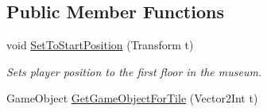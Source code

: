 \subsection*{Public Member Functions}
\begin{DoxyCompactItemize}
\item 
void \mbox{\hyperlink{class_museum_builder_a875e7252e31ad7ae28f17eb365ef5ce5}{Set\+To\+Start\+Position}} (Transform t)
\begin{DoxyCompactList}\small\item\em Sets player position to the first floor in the museum. \end{DoxyCompactList}\item 
Game\+Object \mbox{\hyperlink{class_museum_builder_acd17822c3c2fdc7552e94dd1627586a7}{Get\+Game\+Object\+For\+Tile}} (Vector2\+Int t)
\end{DoxyCompactItemize}
